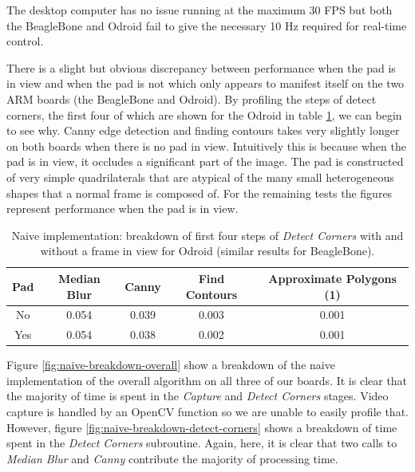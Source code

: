 \documentclass{acm_proc_article-sp}
\begin{document}
The desktop computer has no issue running at the maximum 30 FPS but both the BeagleBone and Odroid fail to give the necessary 10 Hz required for real-time control. 

There is a slight but obvious discrepancy between performance when the pad is in view and when the pad is not which only appears to manifest itself on the two ARM boards (the BeagleBone and Odroid). By profiling the steps of detect corners, the first four of which are shown for the Odroid in table \ref{tab:naive-frame-vs-no-frame}, we can begin to see why. Canny edge detection and finding contours takes very slightly longer on both boards when there is no pad in view. Intuitively this is because when the pad is in view, it occludes a significant part of the image. The pad is constructed of very simple quadrilaterals that are atypical of the many small heterogeneous shapes that a normal frame is composed of. For the remaining tests the figures represent performance when the pad is in view.

\begin{table}[htbp]
  \centering
    \begin{tabular}{ccccc}
    \toprule
    \textbf{Pad} & \textbf{Median Blur} & \textbf{Canny} & \textbf{Find Contours} & \textbf{Approximate Polygons (1)} \\
    \midrule
    No    & 0.054 & 0.039 & 0.003 & 0.001 \\
    Yes   & 0.054 & 0.038 & 0.002 & 0.001 \\
    \bottomrule
    \end{tabular}%
  \caption{Naive implementation: breakdown of first four steps of \textit{Detect Corners} with and without a frame in view for Odroid (similar results for BeagleBone).}%
  \label{tab:naive-frame-vs-no-frame}%
\end{table}%
 
Figure \ref{fig:naive-breakdown-overall} show a breakdown of the naive implementation of the overall algorithm on all three of our boards. It is clear that the majority of time is spent in the \textit{Capture} and \textit{Detect Corners} stages. Video capture is handled by an OpenCV function so we are unable to easily profile that. However, figure \ref{fig:naive-breakdown-detect-corners} shows a breakdown of time spent in the \textit{Detect Corners} subroutine. Again, here, it is clear that two calls to \textit{Median Blur} and \textit{Canny} contribute the majority of processing time.
\end{document}

